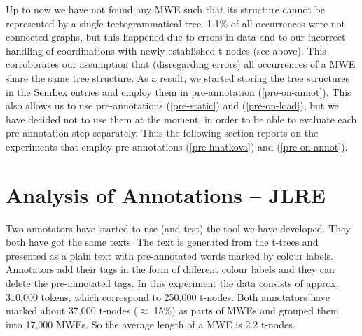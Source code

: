 
Up to now we have not found any MWE such that its structure cannot be represented by a single tectogrammatical tree. 1.1\% of all occurrences were not connected graphs, but this happened due to errors in data and to our incorrect handling of coordinations with newly established t-nodes (see above). This corroborates our assumption that (disregarding errors) all occurrences of a MWE share the same tree structure. As a result, we started storing the tree structures in the SemLex entries and employ them in pre-annotation (\ref{pre-on-annot}). This also allows us to use pre-annotations (\ref{pre-static}) and (\ref{pre-on-load}), but we have decided not to use them at the moment, in order to be able to evaluate each pre-annotation step separately. Thus the following section reports on the experiments that employ pre-annotations (\ref{pre-hnatkova}) and (\ref{pre-on-annot}).


\section{Analysis of Annotations – JLRE}
\label{sec:annot:analysis}
Two annotators have started to use (and test) the tool we have developed.
They both have got the same texts. The text is generated from the t-trees and presented as a plain text with pre-annotated words mark\-ed by colour labels. Annotators add their tags in the form of different colour labels and they can delete the pre-annotated tags. 
In this experiment the data consists of approx. 310,000 tokens, which correspond to 250,000 t-nodes.
Both annotators have marked about 37,000 t-nodes ($\approx$ 15\%) as parts of MWEs and grouped them into 17,000 MWEs. So the average length of a MWE is 2.2 t-nodes.

